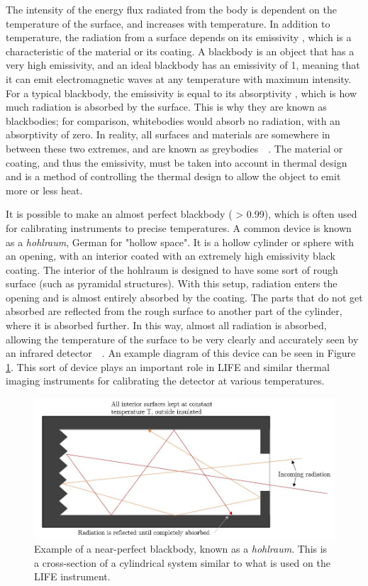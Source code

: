 The intensity of the energy flux radiated from the body is dependent on the temperature of the surface, and increases with temperature. In addition to temperature, the radiation from a surface depends on its emissivity {\textepsilon}, which is a characteristic of the material or its coating. A blackbody is an object that has a very high emissivity, and an ideal blackbody has an emissivity of 1, meaning that it can emit electromagnetic waves at any temperature with maximum intensity. For a typical blackbody, the emissivity is equal to its absorptivity {\textalpha}, which is how much radiation is absorbed by the surface. This is why they are known as blackbodies; for comparison, whitebodies would absorb no radiation, with an absorptivity of zero. In reality, all surfaces and materials are somewhere in between these two extremes, and are known as greybodies~\citep{Heat_Transfer_Basics}~\citep{heat_transfer_textbook}. The material or coating, and thus the emissivity, must be taken into account in thermal design and is a method of controlling the thermal design to allow the object to emit more or less heat.

It is possible to make an almost perfect blackbody ({\textepsilon} {\textgreater} 0.99), which is often used for calibrating instruments to precise temperatures. A common device is known as a \textit{hohlraum}, German for "hollow space". It is a hollow cylinder or sphere with an opening, with an interior coated with an extremely high emissivity black coating. The interior of the hohlraum is designed to have some sort of rough surface (such as pyramidal structures). With this setup, radiation enters the opening and is almost entirely absorbed by the coating. The parts that do not get absorbed are reflected from the rough surface to another part of the cylinder, where it is absorbed further. In this way, almost all radiation is absorbed, allowing the temperature of the surface to be very clearly and accurately seen by an infrared detector~\citep{Heat_Transfer_Basics}~\citep{heat_transfer_textbook}. An example diagram of this device can be seen in Figure \ref{fig:blackbody_example}. This sort of device plays an important role in LIFE and similar thermal imaging instruments for calibrating the detector at various temperatures.

 \begin{figure}
\centering
  \includegraphics[width=\linewidth]{chap2_images/blackbody_example.JPG}
  \caption{Example of a near-perfect blackbody, known as a \textit{hohlraum}. This is a cross-section of a cylindrical system similar to what is used on the LIFE instrument.}
  \label{fig:blackbody_example}
\end{figure}

